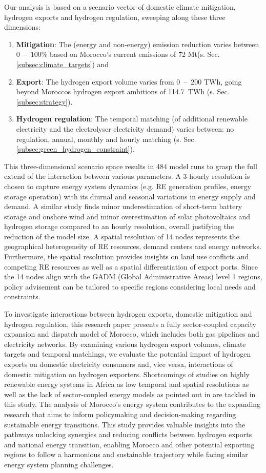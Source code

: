 Our analysis is based on a scenario vector of domestic climate mitigation, hydrogen exports and hydrogen regulation, sweeping along these three dimensions:
\begin{enumerate}
    \item \textbf{Mitigation}: The (energy and non-energy) emission reduction varies between 0~--~100\% based on Morocco's current emissions of 72 Mt\coe (s. Sec. \ref{subsec:climate_targets}) and
    \item \textbf{Export}: The hydrogen export volume varies from 0~--~200 TWh, going beyond Moroccos hydrogen export ambitions of 114.7~TWh (s. Sec. \ref{subsec:strategy}).
    \item \textbf{Hydrogen regulation}: The temporal matching (of additional renewable electricity and the electrolyser electricity demand) varies between: no regulation, annual, monthly and hourly matching (s. Sec. \ref{subsec:green_hydrogen_constraint}). 
\end{enumerate}
This three-dimensional scenario space results in 484 model runs to grasp the full extend of the interaction between various parameters.
A 3-hourly resolution is chosen to capture energy system dynamics (e.g. RE generation profiles, energy storage operation) with its diurnal and seasonal variations in energy supply and demand. A similar study \cite{Neumann2022} finds minor underestimation of short-term battery storage and onshore wind and minor overestimation of solar photovoltaics and hydrogen storage compared to an hourly resolution, overall justifying the reduction of the model size. 
A spatial resolution of 14 nodes represents the geographical heterogeneity of RE resources, demand centers and energy networks. Furthermore, the spatial resolution provides insights on land use conflicts and competing RE resources as well as a spatial differentiation of export ports. Since the 14 nodes align with the GADM (Global Administrative Areas) level 1 regions, policy advisement can be tailored to specific regions considering local needs and constraints.


To investigate interactions between hydrogen exports, domestic mitigation and hydrogen regulation, this research paper presents a fully sector-coupled capacity expansion and dispatch model of Morocco, which includes both gas pipelines and electricity networks. By examining various hydrogen export volumes, climate targets and temporal matchings, we evaluate the potential impact of hydrogen exports on domestic electricity consumers and, vice versa, interactions of domestic mitigation on hydrogen exporters.
Shortcomings of studies on highly renewable energy systems in Africa as low temporal and spatial resolutions as well as the lack of sector-coupled energy models as pointed out in \cite{Oyewo2023} are tackled in this study. The analysis of Morocco's energy system contributes to the expanding research that aims to inform policymaking and decision-making regarding sustainable energy transitions. This study provides valuable insights into the pathways unlocking synergies and reducing conflicts between hydrogen exports and national energy transition, enabling Morocco and other potential exporting regions to follow a harmonious and sustainable trajectory while facing similar energy system planning challenges.

